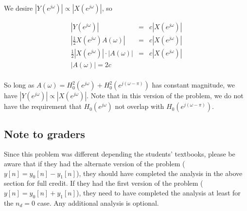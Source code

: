 \documentclass[11pt]{article}
\begin{document}
We desire $|Y(e^{j\omega})| \propto |X(e^{j\omega})|$, so 

\begin{eqnarray*}
|Y(e^{j\omega})| &=& c |X(e^{j\omega})| \\
|\frac{1}{2}X(e^{j\omega})A(\omega)|&=& c |X(e^{j\omega})| \\
\frac{1}{2}|X(e^{j\omega})|\cdot |A(\omega)|&=& c |X(e^{j\omega})| \\
|A(\omega)| = 2c \\
\end{eqnarray*}

So long as $A(\omega) = H_0^2(e^{j\omega})+H_0^2(e^{j(\omega-\pi)})$ has constant magnitude, we have $|Y(e^{j\omega})| \propto |X(e^{j\omega})|$. Note that in this version of the problem, we do not have the requirement that $H_0(e^{j\omega})$ not overlap with $H_0(e^{j(\omega-\pi)})$.

\subsection*{Note to graders}

Since this problem was different depending the students' textbooks, please be aware that if they had the alternate version of the problem ($y[n]=y_0[n]-y_1[n]$), they should have completed the analysis in the above section for full credit. If they had the first version of the problem ($y[n]=y_0[n]+y_1[n]$), they need to have completed the analysis at least for the $n_d=0$ case. Any additional analysis is optional.
\end{document}
